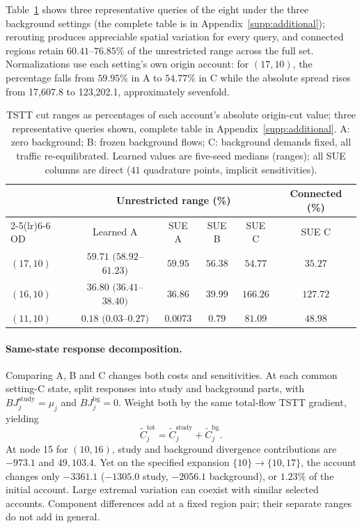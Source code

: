 Table~\ref{tab:cutspreadperod} shows three representative queries of the eight under the three background settings (the complete table is in Appendix~\ref{supp:additional}); rerouting produces appreciable spatial variation for every query, and connected regions retain $60.41$--$76.85\%$ of the unrestricted range across the full set. Normalizations use each setting's own origin account: for $(17,10)$, the percentage falls from $59.95\%$ in A to $54.77\%$ in C while the absolute spread rises from 17,607.8 to 123,202.1, approximately sevenfold.
\begin{table}[pos=htbp]
\footnotesize
\caption{TSTT cut ranges as percentages of each account's absolute
origin-cut value; three representative queries shown, complete table in
Appendix~\ref{supp:additional}. A: zero background; B: frozen background
flows; C: background demands fixed, all traffic re-equilibrated. Learned
values are five-seed medians (ranges); all SUE columns are direct
($41$ quadrature points, implicit sensitivities).}\label{tab:cutspreadperod}
\small
\begin{tabular*}{\tblwidth}{@{\extracolsep{\fill}}lccccc}
\toprule
& \multicolumn{4}{c}{Unrestricted range (\%)} & Connected (\%)\\
\cmidrule(lr){2-5}\cmidrule(lr){6-6}
OD & Learned A & SUE A & SUE B & SUE C & SUE C\\
\midrule
$(17,10)$ & $59.71$ $(58.92$--$61.23)$ & $59.95$ & $56.38$ & $54.77$ & $35.27$ \\
$(16,10)$ & $36.80$ $(36.41$--$38.40)$ & $36.86$ & $39.99$ & $166.26$ & $127.72$ \\
$(11,10)$ & $0.18$ $(0.03$--$0.27)$ & $0.0073$ & $0.79$ & $81.09$ & $48.98$ \\
\bottomrule
\end{tabular*}
\end{table}
\paragraph{Same-state response decomposition.}\label{subsec:bgsplit}
Comparing A, B and C changes both costs and sensitivities. At each common setting-C state, split responses into study and background parts, with $BJ_j^{\mathrm{study}}=\mu_j$ and $BJ_j^{\mathrm{bg}}=0$. Weight both by the same total-flow TSTT gradient, yielding
\begin{equation}
\widetilde C_j^{\mathrm{tot}}=\widetilde C_j^{\mathrm{study}}+\widetilde C_j^{\mathrm{bg}}.
\label{eq:bg_attribution}
\end{equation}
At node 15 for $(10,16)$, study and background divergence contributions are $-973.1$ and $49{,}103.4$. Yet on the specified expansion $\{10\}\to\{10,17\}$, the account changes only $-3361.1$ ($-1305.0$ study, $-2056.1$ background), or $1.23\%$ of the initial account. Large extremal variation can coexist with similar selected accounts. Component differences add at a fixed region pair; their separate ranges do not add in general.

